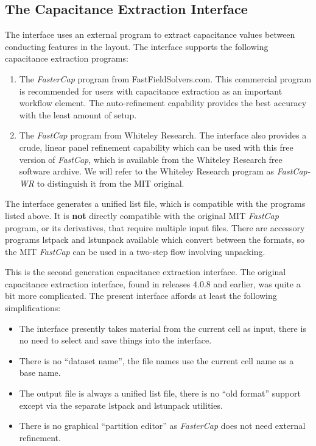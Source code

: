 \subsection{The Capacitance Extraction Interface}
\label{fcinterf}

The interface uses an external program to extract capacitance values
between conducting features in the layout.  The interface supports the
following capacitance extraction programs:

\begin{enumerate}
\item{The {\it FasterCap} program from {\vt FastFieldSolvers.com}. 
This commercial program is recommended for users with capacitance
extraction as an important workflow element.  The auto-refinement
capability provides the best accuracy with the least amount of setup.}

\item{The {\it FastCap} program from Whiteley Research.  The interface
also provides a crude, linear panel refinement capability which can be
used with this free version of {\it FastCap\/}, which is available
from the Whiteley Research free software archive.  We will refer to
the Whiteley Research program as {\it FastCap-WR} to distinguish it
from the MIT original.}
\end{enumerate}

The interface generates a unified list file, which is compatible with
the programs listed above.  It is {\bf not} directly compatible with
the original MIT {\it FastCap} program, or its derivatives, that
require multiple input files.  There are accessory programs {\vt
lstpack} and {\vt lstunpack} available which convert between the
formats, so the MIT {\it FastCap} can be used in a two-step flow
involving unpacking.

This is the second generation capacitance extraction interface.  The
original capacitance extraction interface, found in releases 4.0.8 and
earlier, was quite a bit more complicated.  The present interface
affords at least the following simplifications:

\begin{itemize}
\item{The interface presently takes material from the current cell
as input, there is no need to select and save things into the
interface.}

\item{There is no ``dataset name'', the file names use the current
cell name as a base name.}

\item{The output file is always a unified list file, there is no ``old
format'' support except via the separate {\vt lstpack} and {\vt
lstunpack} utilities.}

\item{There is no graphical ``partition editor'' as {\it FasterCap}
does not need external refinement.}
\end{itemize}

